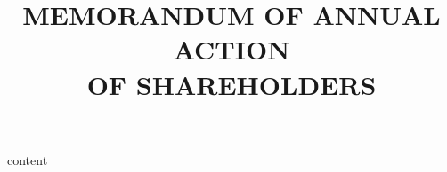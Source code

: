 \documentclass[12pt]{scrartcl}
\title{MEMORANDUM OF ANNUAL ACTION\\OF SHAREHOLDERS}
\begin{document}
\maketitle
{content}
\end{document}
